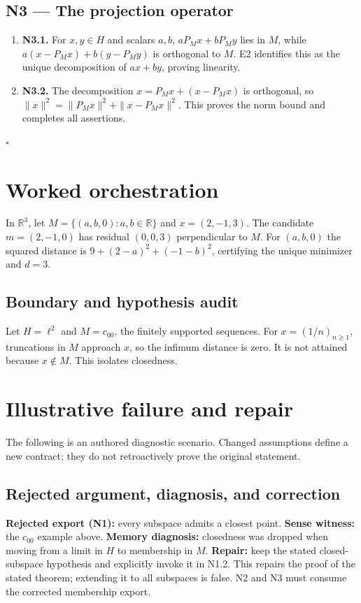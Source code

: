 \documentclass[preprint,12pt,aps,pra,showkeys,amsmath,amssymb,superscriptaddress,floatfix]{revtex4-2}
\theoremstyle{definition}
\theoremstyle{remark}
\begin{document}
\subsection{N3 --- The projection
operator}\label{n3-the-projection-operator}

\begin{enumerate}
\def\labelenumi{\arabic{enumi}.}
\item
  \textbf{N3.1.} For \(x,y\in H\) and scalars \(a,b\), \(aP_Mx+bP_My\)
  lies in \(M\), while \(a(x-P_Mx)+b(y-P_My)\) is orthogonal to \(M\).
  E2 identifies this as the unique decomposition of \(ax+by\), proving
  linearity.
\item
  \textbf{N3.2.} The decomposition \(x=P_Mx+(x-P_Mx)\) is orthogonal, so
  \(\|x\|^2=\|P_Mx\|^2+\|x-P_Mx\|^2\). This proves the norm bound and
  completes all assertions.
\end{enumerate}

\hfill$\square$

\section{Worked orchestration}

In \(\mathbb R^3\), let \(M=\{(a,b,0):a,b\in\mathbb R\}\) and
\(x=(2,-1,3)\). The candidate \(m=(2,-1,0)\) has residual \((0,0,3)\)
perpendicular to \(M\). For \((a,b,0)\) the squared distance is
\(9+(2-a)^2+(-1-b)^2\), certifying the unique minimizer and \(d=3\).

\subsection{Boundary and hypothesis audit}

Let \(H=\ell^2\) and \(M=c_{00}\), the finitely supported sequences. For
\(x=(1/n)_{n\ge1}\), truncations in \(M\) approach \(x\), so the infimum
distance is zero. It is not attained because \(x\notin M\). This
isolates closedness.

\section{Illustrative failure and repair}

The following is an authored diagnostic scenario. Changed assumptions
define a new contract; they do not retroactively prove the original
statement.

\subsection{Rejected argument, diagnosis, and correction}
\textbf{Rejected export (N1):} every subspace admits a closest point.
\textbf{Sense witness:} the \(c_{00}\) example above. \textbf{Memory
diagnosis:} closedness was dropped when moving from a limit in \(H\) to
membership in \(M\). \textbf{Repair:} keep the stated closed-subspace
hypothesis and explicitly invoke it in N1.2. This repairs the proof of
the stated theorem; extending it to all subspaces is false. N2 and N3
must consume the corrected membership export.
\end{document}
